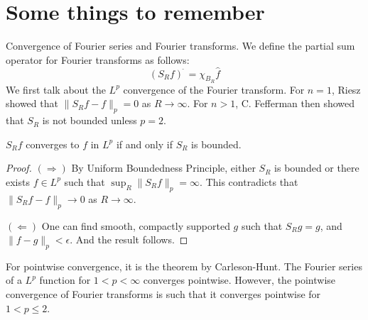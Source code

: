 \chapter{Some things to remember}


Convergence of Fourier series and Fourier transforms.
We define the partial sum operator for Fourier transforms as follows:
\begin{equation*}
    (S_Rf)^{\widehat{\phantom{.}}}=\chi_{B_R}\widehat{f}
\end{equation*}
We first talk about the $L^p$ convergence of the Fourier transform. For $n=1$, Riesz showed that $\|S_Rf-f\|_p=0$ as $R\to\infty$. For $n>1$, C. Fefferman then showed that $S_R$ is not bounded unless $p=2$.
\begin{thm}
    $S_Rf$ converges to $f$ in $L^p$ if and only if $S_R$ is bounded.
\end{thm}
\begin{proof}
    $(\Rightarrow)$ By Uniform Boundedness Principle, either $S_R$ is bounded or there exists $f\in L^p$ such that $\sup_R\|S_Rf\|_p=\infty$. This contradicts that $\|S_Rf-f\|_p\to 0$ as $R\to\infty$.

    $(\Leftarrow)$ One can find smooth, compactly supported $g$ such that $S_Rg=g$, and $\|f-g\|_p<\epsilon$. And the result follows.
\end{proof}

For pointwise convergence, it is the theorem by Carleson-Hunt. The Fourier series of a $L^p$ function for $1<p<\infty$ converges pointwise. However, the pointwise convergence of Fourier transforms is such that it converges pointwise for $1< p\leq 2$.

